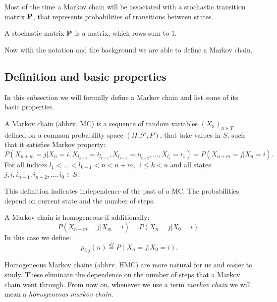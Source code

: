 	Most of the time a Markov chain will be associated with a stochastic transition matrix $\mathbf{P}$, that represents probabilities of transitions between states.
	\begin{definition}
		A stochastic matrix $\mathbf{P}$ is a matrix, which rows sum to $1$.
	\end{definition}
	
	Now with the notation and the background we are able to define a Markov chain.
	
\subsection{Definition and basic properties}
	In this subsection we will formally define a Markov chain and list some of its basic properties.
	
	\begin{definition}
		A Markov chain (abbrv. MC) is a sequence of random variables $\left( X_n\right)_{n \in T}$ defined on a common probability space $\left( \Omega, \mathcal{F}, P \right)$, that take values in $S$, such that it satisfies Markov property:
		\begin{equation*}
			P(X_{n+m} = j | X_n = i, X_{l_{k-1}} = i_{l_{k-1}}, X_{l_{k-2}} = i_{l_{k-2}}, \ldots, X_{l_1} = i_1) = P(X_{n+m} = j | X_n = i).
		\end{equation*}
		For all indices $l_1< \ldots < l_{k-1} < n < n+m, \; 1 \leq k < n$ and all states $j, i, i_{n-1}, i_{n-2}, \ldots, i_0 \in S$.
	\end{definition}
	This definition indicates independence of the past of a MC. The probabilities depend on current state and the number of steps.

	\begin{definition}
		A Markov chain is homogeneous if additionally:
		\begin{equation*}
			P(X_{n+m} = j | X_m = i) = P(X_{n} = j | X_0 = i).
		\end{equation*}
		In this case we define:
		\begin{equation*}
			p_{i,j}(n) \overset{df}{=} P(X_{n} = j | X_0 = i).
		\end{equation*}
	\end{definition}
	Homogeneous Markov chains (abbrv. HMC) are more natural for us and easier to study. These eliminate the dependence on the number of steps that a Markov chain went through. From now on, whenever we use a term \textit{markov chain} we will mean a \textit{homogeneous markov chain}.
	
